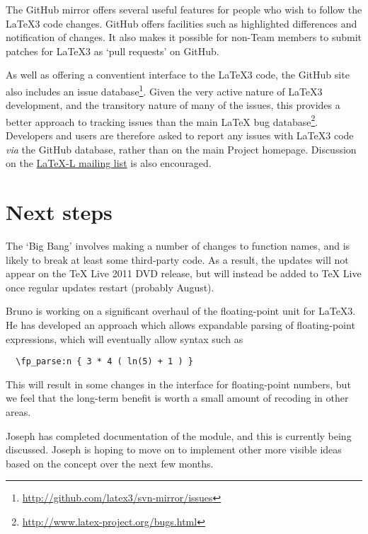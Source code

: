 \documentclass{ltnews}
\begin{document}
The GitHub mirror offers several useful features for people who wish to
follow the \LaTeX3 code changes. GitHub offers facilities such as highlighted
differences and notification of changes. It also makes it possible for
non-Team members to submit patches for \LaTeX3 as `pull requests' on
GitHub.

As well as offering a conventient interface to the \LaTeX3 code, the GitHub
site also includes an issue database\footnote{%
\url{http://github.com/latex3/svn-mirror/issues}}. Given the very
active nature of \LaTeX3 development, and the transitory nature of many
of the issues, this provides a better approach to tracking issues than
the main \LaTeX{} bug database\footnote{\url{http://www.latex-project.org/bugs.html}}.
Developers and users are
therefore asked to report any issues with \LaTeX3 code \emph{via} the GitHub
database, rather than on the main Project homepage.
Discussion on the \href{http://www.latex-project.org/code.html}{\mbox{LaTeX-L} mailing list}
is also encouraged.

\section{Next steps}

The `Big Bang' involves making a number of changes to  function
names, and is likely to break at least some third-party code. As a result,
the updates will not appear on the \TeX{} Live 2011 DVD release, but will
instead be added to \TeX{} Live once regular updates restart (probably
August).

Bruno is working on a significant overhaul of the  floating-point
unit for \LaTeX3. He has developed an approach which allows expandable
parsing of floating-point expressions, which will eventually allow syntax
such as
\begin{verbatim}
  \fp_parse:n { 3 * 4 ( ln(5) + 1 ) }
\end{verbatim}
This will result in some changes in the interface for floating-point numbers, but
we feel that the long-term benefit is worth a small amount of recoding in other
areas.

Joseph has completed documentation of the  module, and this is
currently being discussed. Joseph is hoping to move on to implement other
more visible ideas based on the  concept over the next few
months.
\end{document}
